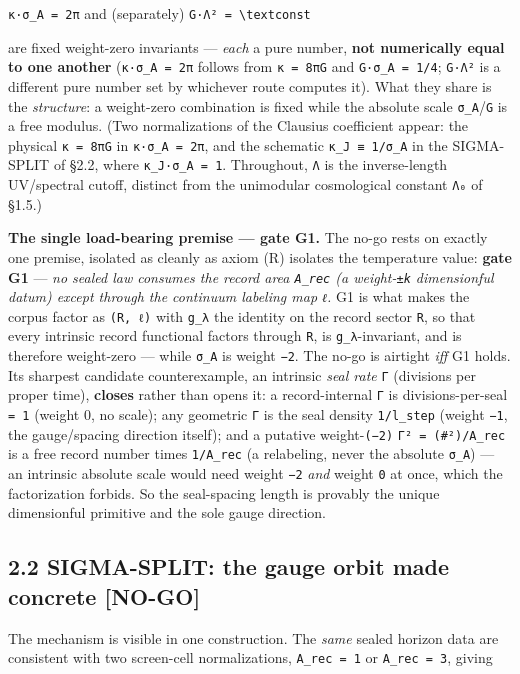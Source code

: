 \documentclass[11pt]{article}
\begin{document}
\texttt{κ·σ\_A = 2π}   and (separately)   \texttt{G·Λ² = \textbackslash{}text{const}}

are fixed weight-zero invariants — \emph{each} a pure number, \textbf{not numerically equal to one another} (\texttt{κ·σ\_A = 2π} follows from \texttt{κ = 8πG} and \texttt{G·σ\_A = 1/4}; \texttt{G·Λ²} is a different pure number set by whichever route computes it). What they share is the \emph{structure}: a weight-zero combination is fixed while the absolute scale \texttt{σ\_A}/\texttt{G} is a free modulus. (Two normalizations of the Clausius coefficient appear: the physical \texttt{κ = 8πG} in \texttt{κ·σ\_A = 2π}, and the schematic \texttt{κ\_J ≡ 1/σ\_A} in the SIGMA-SPLIT of §2.2, where \texttt{κ\_J·σ\_A = 1}. Throughout, \texttt{Λ} is the inverse-length UV/spectral cutoff, distinct from the unimodular cosmological constant \texttt{Λ₀} of §1.5.)

\textbf{The single load-bearing premise — gate G1.} The no-go rests on exactly one premise, isolated as cleanly as axiom (R) isolates the temperature value: \textbf{gate G1} — \emph{no sealed law consumes the record area \texttt{A\_rec} (a weight-\texttt{±k} dimensionful datum) except through the continuum labeling map \texttt{ℓ}.} G1 is what makes the corpus factor as \texttt{(R, ℓ)} with \texttt{g\_λ} the identity on the record sector \texttt{R}, so that every intrinsic record functional factors through \texttt{R}, is \texttt{g\_λ}-invariant, and is therefore weight-zero — while \texttt{σ\_A} is weight \texttt{−2}. The no-go is airtight \emph{iff} G1 holds. Its sharpest candidate counterexample, an intrinsic \emph{seal rate} \texttt{Γ} (divisions per proper time), \textbf{closes} rather than opens it: a record-internal \texttt{Γ} is divisions-per-seal \texttt{= 1} (weight 0, no scale); any geometric \texttt{Γ} is the seal density \texttt{1/l\_step} (weight \texttt{−1}, the gauge/spacing direction itself); and a putative weight-\texttt{(−2)} \texttt{Γ² = (\#²)/A\_rec} is a free record number times \texttt{1/A\_rec} (a relabeling, never the absolute \texttt{σ\_A}) — an intrinsic absolute scale would need weight \texttt{−2} \emph{and} weight \texttt{0} at once, which the factorization forbids. So the seal-spacing length is provably the unique dimensionful primitive and the sole gauge direction.

\subsection*{2.2 SIGMA-SPLIT: the gauge orbit made concrete [NO-GO]}
The mechanism is visible in one construction. The \emph{same} sealed horizon data are consistent with two screen-cell normalizations, \texttt{A\_rec = 1} or \texttt{A\_rec = 3}, giving
\end{document}
